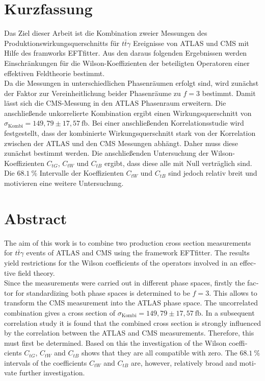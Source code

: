 \thispagestyle{plain}
\section*{Kurzfassung}
Das Ziel dieser Arbeit ist die Kombination zweier Messungen des Produktionswirkungsquerschnitts für $t\bar{t}\gamma$ Ereignisse von ATLAS\cite{Aaboud:2017era} und CMS\cite{Sirunyan:2017iyh} mit Hilfe des framworks EFTfitter\cite{Castro:2016jjv}. Aus den daraus folgenden Ergebnissen werden Einschränkungen für die
Wilson-Koeffizienten der beteiligten Operatoren einer effektiven Feldtheorie bestimmt.\\
Da die Messungen in unterschiedlichen Phasenräumen erfolgt sind, wird zunächst der Faktor zur Vereinheitlichung beider Phasenräume zu $f=3$ bestimmt. Damit lässt sich die CMS-Messung in den ATLAS Phasenraum erweitern. Die anschließende unkorrelierte Kombination ergibt einen Wirkungsquerschnitt von $\sigma_{\text{Kombi}} = 149,79 \pm 17,57~ \si{\femto\barn}$. Bei einer anschließenden Korrelationsstudie wird festgestellt, dass der kombinierte Wirkungsquerschnitt stark von der Korrelation zwischen der ATLAS und den CMS Messungen abhängt. Daher muss diese zunächst bestimmt werden. Die anschließenden Untersuchung der Wilson-Koeffizienten $C_{tG}$, $C_{tW}$ und $C_{tB}$ ergibt, dass diese alle mit Null verträglich sind. Die $\SI{68.1}{\percent}$ Intervalle der Koeffizienten $C_{tW}$ und $C_{tB}$ sind jedoch relativ breit und motivieren eine weitere Untersuchung.
\section*{Abstract}
\begin{english}
  The aim of this work is to combine two production cross section measurements for $t\bar{t}\gamma$ events of ATLAS\cite{Aaboud:2017era} and CMS\cite{Sirunyan:2017iyh} using the framework EFTfitter\cite{Castro:2016jjv}. The results yield restrictions for the
  Wilson coefficients of the operators involved in an effective field theory.\\
  Since the measurements were carried out in different phase spaces, firstly the factor for standardizing both phase spaces is determined to be $f=3$. This allows to transform the CMS measurement into the ATLAS phase space. The uncorrelated combination gives a cross section of $\sigma_{\text{Kombi}} = 149,79 \pm 17,57~ \si{\femto\barn}$. In a subsequent correlation study it is found that the combined cross section is strongly influenced by the correlation between the ATLAS and CMS measurements. Therefore, this must first be determined. Based on this the investigation of the Wilson coefficients $C_{tG}$, $C_{tW}$ and $C_{tB}$ shows that they are all compatible with zero. The $\SI{68.1}{\percent}$  intervals of the coefficients $C_{tW}$ and $C_{tB}$ are, however, relatively broad and motivate further investigation.
\end{english}
